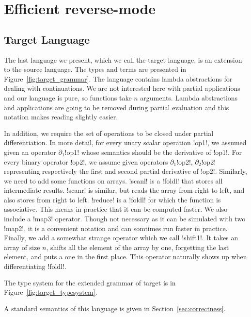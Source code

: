 \section{Efficient reverse-mode}
\label{sec:efficientrad}

\subsection{Target Language} 

The last language we present, which we call the target language, is an extension to the source language. 
The types and terms are presented in Figure~\ref{fig:target_grammar}.
The language contains lambda abstractions for dealing with continuations. 
We are not interested here with partial applications and our language is pure, so functions take $n$ arguments.
Lambda abstractions and applications are going to be removed during partial evaluation and this notation makes reading slightly easier.



In addition, we require the set of operations to be closed under partial differentiation. 
In more detail, for every unary scalar operation !op1!, 
we assumed given an operator $\partial_1$!op1! whose semantics should be the derivative of !op1!.
For every binary operator !op2!, we assume given operators $\partial_1$!op2!, $\partial_2$!op2! 
representing respectively the first and second partial derivative of !op2!.
Similarly, we need to add some functions on arrays. 
!scanl! is a !foldl! that stores all intermediate results. 
!scanr! is similar, but reads the array from right to left, and also stores from right to left.
!reduce! is a !foldl! for which the function is associative. 
This means in practice that it can be computed faster.
We also include a !map3! operator. 
Though not necessary as it can be simulated with two !map2!, it is a convenient notation and can somtimes run faster in practice.
Finally, we add a somewhat strange operator which we call !shift1!. 
It takes an array of size $n$,  shifts all the element of the array by one, 
forgetting the last element, and puts a one in the first place. 
This operator naturally shows up when differentiating !foldl!.

The type system for the extended grammar of target is in Figure~\ref{fig:target_typesystem}. 



A standard semantics of this language is given in Section~\ref{sec:correctness}.

